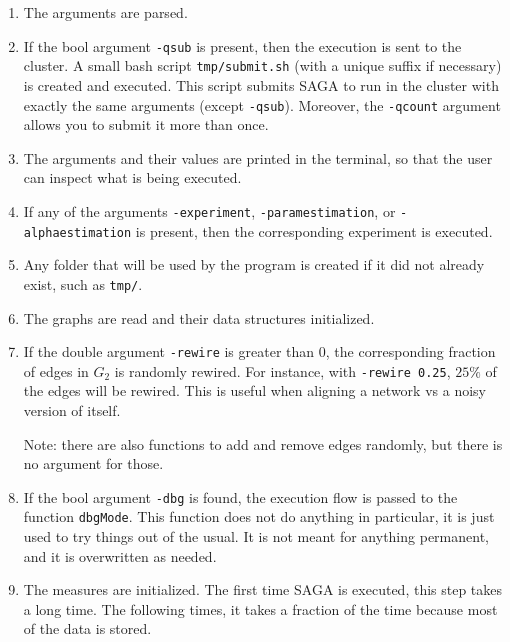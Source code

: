 \documentclass[]{article}
\begin{document}
\begin{enumerate}

\item The arguments are parsed.

\item If the bool argument \texttt{-qsub} is present, then the execution is sent to the cluster. A small bash script \texttt{tmp/submit.sh} (with a unique suffix if necessary) is created and executed. This script submits SAGA to run in the cluster with exactly the same arguments (except \texttt{-qsub}). Moreover, the \texttt{-qcount} argument allows you to submit it more than once.

\item The arguments and their values are printed in the terminal, so that the user can inspect what is being executed.

\item If any of the arguments \texttt{-experiment}, \texttt{-paramestimation}, or \texttt{-alphaestimation} is present, then the corresponding experiment is executed.

\item Any folder that will be used by the program is created if it did not already exist, such as \texttt{tmp/}.

\item The graphs are read and their data structures initialized.

\item If the double argument \texttt{-rewire} is greater than $0$, the corresponding fraction of edges in $G_2$ is randomly rewired. For instance, with \texttt{-rewire 0.25}, $25\%$ of the edges will be rewired. This is useful when aligning a network vs a noisy version of itself.

Note: there are also functions to add and remove edges randomly, but there is no argument for those.

\item If the bool argument \texttt{-dbg} is found, the execution flow is passed to the function \texttt{dbgMode}. This function does not do anything in particular, it is just used to try things out of the usual. It is not meant for anything permanent, and it is overwritten as needed.

\item The measures are initialized. The first time SAGA is executed, this step takes a long time. The following times, it takes a fraction of the time because most of the data is stored.


\end{enumerate}
\end{document}
